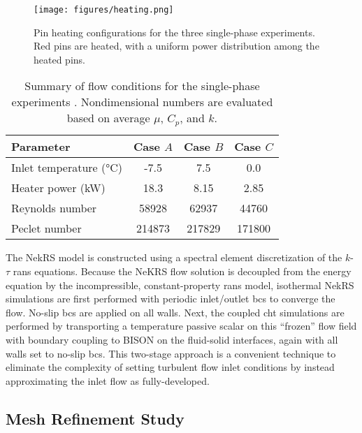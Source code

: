 \documentclass[3p,,preprint,11pt]{elsarticle}
\begin{document}
\begin{figure}[!htb]                                                                                                  
\centering
\texttt{[image: figures/heating.png]}
\caption{Pin heating configurations for the three single-phase experiments. Red pins are heated, with a uniform power distribution among the heated pins.}
\label{fig:heating}
\end{figure}

\begin{table}[htb!]
\caption{Summary of flow conditions for the single-phase experiments \cite{cheng2009}. Nondimensional numbers are evaluated based on average $\mu$, $C_p$, and $k$.}
\centering
\begin{tabular}{@{}lccc@{}}
\toprule
Parameter & Case $A$ & Case $B$ & Case $C$ \\
\midrule
Inlet temperature (\si{\celsius}) & -7.5 & 7.5 & 0.0\\
Heater power (\si{\kilo\watt}) & 18.3 & 8.15 & 2.85\\
Reynolds number & 58928 & 62937 & 44760\\
Peclet number & 214873 & 217829 & 171800\\
\bottomrule
\end{tabular}
\label{table:cases}
\end{table}

The NekRS model is constructed using a spectral element discretization of the $k$-$\tau$ \gls{rans} equations. 
Because the NeKRS flow solution is decoupled from the energy equation by the incompressible, constant-property \gls{rans} model, isothermal NekRS simulations are first performed with periodic inlet/outlet \glspl{bc} to converge the flow. No-slip \glspl{bc} are applied on all walls. Next, the coupled \gls{cht} simulations are performed by transporting a temperature passive scalar on this ``frozen'' flow field with boundary coupling to BISON on the fluid-solid interfaces, again with all walls set to no-slip \glspl{bc}. This two-stage approach is a convenient technique to eliminate the complexity of setting turbulent flow inlet conditions by instead approximating the inlet flow as fully-developed. 

\subsection{Mesh Refinement Study}
\label{sec:cheng_mr}
\end{document}
